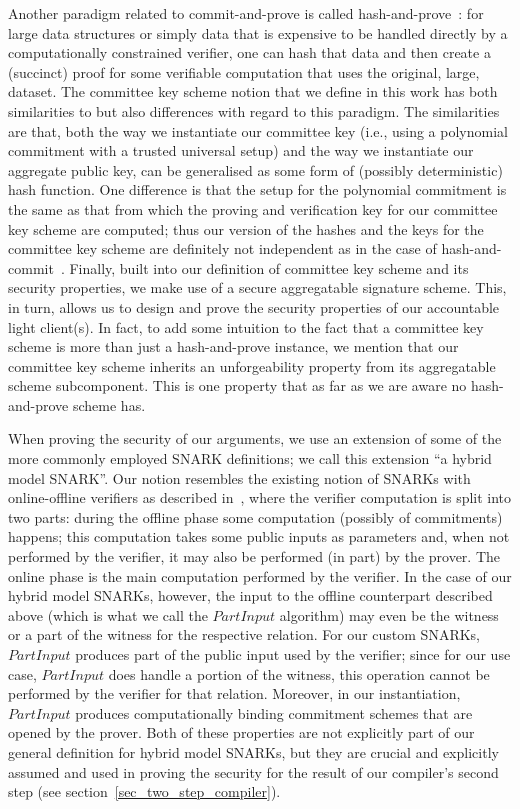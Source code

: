 Another paradigm related to commit-and-prove is called hash-and-prove~\cite{HP_paper}: for large data structures or simply data that is expensive to be 
handled directly by a computationally constrained verifier, one can hash that data and then create a (succinct) proof for some verifiable computation that uses 
the original, large, dataset. The committee key scheme notion that we define in this work has both similarities to but also differences with regard to this 
paradigm. The similarities are that, both the way we instantiate our committee key (i.e., using a polynomial commitment 
with a trusted universal setup) and the way we instantiate our aggregate public key, can be generalised as some form of (possibly deterministic) 
hash function. One difference is that the setup for the polynomial commitment is the same as that from which the proving and verification key for our committee key scheme are 
computed; thus our version of the hashes and the keys for the committee key scheme are definitely not independent as in the case of hash-and-commit~\cite{HP_paper}. Finally, 
built into our definition of committee key scheme and its security properties, we make use of a secure aggregatable signature scheme. This, in turn, allows us to design and 
prove the security properties of our accountable light client(s). In fact, to add some intuition to the fact that a committee key scheme is more than 
just a hash-and-prove instance, we mention that our committee key scheme inherits an unforgeability property from its aggregatable scheme subcomponent. 
This is one property that as far as we are aware no hash-and-prove scheme has.

When proving the security of our arguments, we use an extension of some of the more commonly employed SNARK definitions; we call this extension ``a hybrid model SNARK''. 
Our notion resembles the existing notion of SNARKs with online-offline verifiers as described in~\cite{HP_paper}, where the verifier computation is split into 
two parts: during the offline phase some computation (possibly of commitments) happens; this computation takes some public inputs as parameters and, when not 
performed by the verifier, it may also be performed (in part) by the prover. The online phase is the main computation performed by the verifier. In the case of our hybrid 
model SNARKs, however, the input to the offline counterpart described above (which is what we call the $\mathit{PartInput}$ algorithm) may even be the witness or 
a part of the witness for the respective relation. For our custom SNARKs, $\mathit{PartInput}$ produces part of the public input used by the verifier; 
since for our use case, $\mathit{PartInput}$ does handle a portion of the witness, this operation cannot be performed by the verifier for that relation. 
Moreover, in our instantiation, $\mathit{PartInput}$ produces computationally binding commitment schemes that are opened by the prover. Both of these properties 
are not explicitly part of our general definition for hybrid model SNARKs, but they are crucial and explicitly assumed and used 
in proving the security for the result of our compiler's second step (see section~\ref{sec_two_step_compiler}).


